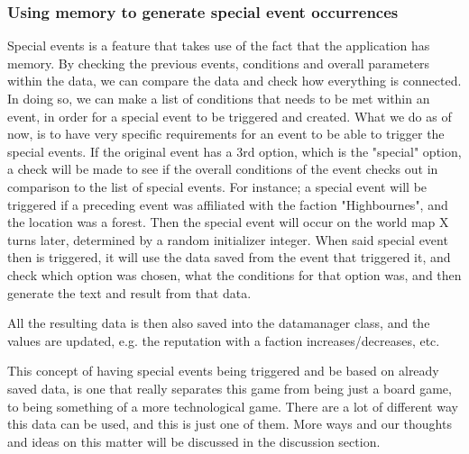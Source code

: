 \subsubsection{Using memory to generate special event occurrences}

Special events is a feature that takes use of the fact that the application has memory. By checking the previous events, conditions and overall parameters within the data, we can compare the data and check how everything is connected. In doing so, we can make a list of conditions that needs to be met within an event, in order for a special event to be triggered and created. What we do as of now, is to have very specific requirements for an event to be able to trigger the special events. If the original event has a 3rd option, which is the "special" option, a check will be made to see if the overall conditions of the event checks out in comparison to the list of special events.
For instance; a special event will be triggered if a preceding event was affiliated with the faction "Highbournes", and the location was a forest. Then the special event will occur on the world map X turns later, determined by a random initializer integer. When said special event then is triggered, it will use the data saved from the event that triggered it, and check which option was chosen, what the conditions for that option was, and then generate the text and result from that data.

All the resulting data is then also saved into the datamanager class, and the values are updated, e.g. the reputation with a faction increases/decreases, etc.


This concept of having special events being triggered and be based on already saved data, is one that really separates this game from being just a board game, to being something of a more technological game. There are a lot of different way this data can be used, and this is just one of them. More ways and our thoughts and ideas on this matter will be discussed in the discussion section.

